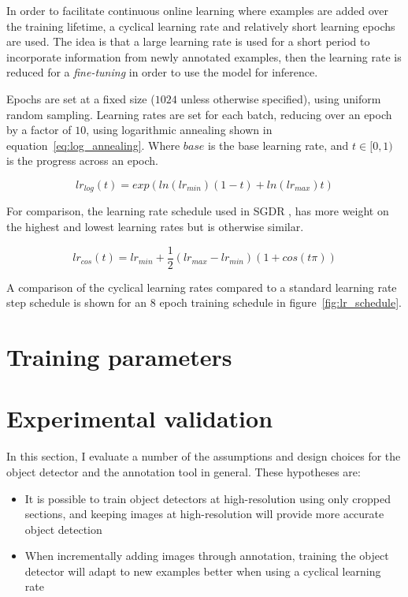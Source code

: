 In order to facilitate continuous online learning where examples are added over the training lifetime, a cyclical learning rate and relatively short learning epochs are used. The idea is that a large learning rate is used for a short period to incorporate information from newly annotated examples, then the learning rate is reduced for a \emph{fine-tuning} in order to use the model for inference.

Epochs are set at a fixed size ($1024$ unless otherwise specified), using uniform random sampling. Learning rates are set for each batch, reducing over an epoch by a factor of $10$, using logarithmic annealing shown in equation~\ref{eq:log_annealing}. Where $base$ is the base learning rate, and $ t \in [0, 1) $ is the progress across an epoch.

\begin{equation}
lr_{log}(t) = exp(ln (lr_{min}) (1 - t) + ln(lr_{max})  t)
\label{eq:log_annealing}
\end{equation}

For comparison, the learning rate schedule used in \gls{SGDR} \cite{Loshchilov2016}, has more weight on the highest and lowest learning rates but is otherwise similar.

\begin{equation}
lr_{cos}(t) = lr_{min} +  \frac{1}{2} (lr_{max} - lr_{min}) (1 + cos (t \pi))
\label{eq:cosine_annealing}
\end{equation}

A comparison of the cyclical learning rates compared to a standard learning rate step schedule is shown for an $8$ epoch training schedule in figure~\ref{fig:lr_schedule}.

\section{Training parameters}
\label{sec:training_parameters}



\section {Experimental validation}
\label{sec:experimental_validation}

In this section, I evaluate a number of the assumptions and design choices for the object detector and the annotation tool in general. These hypotheses are:

\begin{itemize}
    \item {It is possible to train object detectors at high-resolution using only cropped sections, and keeping images at high-resolution will provide more accurate object detection}
    \item {When incrementally adding images through annotation, training the object detector will adapt to new examples better when using a cyclical learning rate}    
\end{itemize} 



